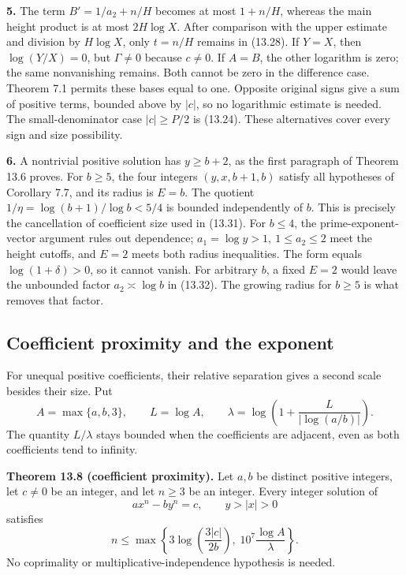 \documentclass[
  11pt,
  a4paper,
]{article}
\begin{document}
\textbf{5.} The term \(B'=1/a_2+n/H\) becomes at most \(1+n/H\), whereas
the main height product is at most \(2H\log X\). After comparison with
the upper estimate and division by \(H\log X\), only \(t=n/H\) remains
in (13.28). If \(Y=X\), then \(\log(Y/X)=0\), but \(\Gamma\ne0\) because
\(c\ne0\). If \(A=B\), the other logarithm is zero; the same
nonvanishing remains. Both cannot be zero in the difference case.
Theorem 7.1 permits these bases equal to one. Opposite original signs
give a sum of positive terms, bounded above by \(|c|\), so no
logarithmic estimate is needed. The small-denominator case
\(|c|\ge P/2\) is (13.24). These alternatives cover every sign and size
possibility.

\textbf{6.} A nontrivial positive solution has \(y\ge b+2\), as the
first paragraph of Theorem 13.6 proves. For \(b\ge5\), the four integers
\((y,x,b+1,b)\) satisfy all hypotheses of Corollary 7.7, and its radius
is \(E=b\). The quotient \(1/\eta=\log(b+1)/\log b<5/4\) is bounded
independently of \(b\). This is precisely the cancellation of
coefficient size used in (13.31). For \(b\le4\), the
prime-exponent-vector argument rules out dependence;
\(a_1=\log y>1,\ 1\le a_2\le2\) meet the height cutoffs, and \(E=2\)
meets both radius inequalities. The form equals \(\log(1+\delta)>0\), so
it cannot vanish. For arbitrary \(b\), a fixed \(E=2\) would leave the
unbounded factor \(a_2\asymp\log b\) in (13.32). The growing radius for
\(b\ge5\) is what removes that factor.

\subsection{Coefficient proximity and the
exponent}\label{coefficient-proximity-and-the-exponent}

For unequal positive coefficients, their relative separation gives a
second scale besides their size. Put \[
A=\max\{a,b,3\},\qquad L=\log A,\qquad
\lambda=\log\left(1+\frac{L}{|\log(a/b)|}\right).
\tag{13.47}
\] The quantity \(L/\lambda\) stays bounded when the coefficients are
adjacent, even as both coefficients tend to infinity.

\textbf{Theorem 13.8 (coefficient proximity).} Let \(a,b\) be distinct
positive integers, let \(c\ne0\) be an integer, and let \(n\ge3\) be an
integer. Every integer solution of \[
ax^n-by^n=c,\qquad y>|x|>0
\] satisfies \[
n\le\max\left\{
3\log\left(\frac{3|c|}{2b}\right),\;
10^7\frac{\log A}{\lambda}\right\}.
\tag{13.48}
\] No coprimality or multiplicative-independence hypothesis is needed.
\end{document}
